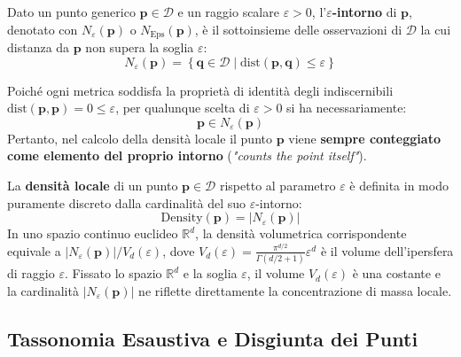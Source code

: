 \begin{definition}
Dato un punto generico $\mathbf{p} \in \mathcal{D}$ e un raggio scalare $\varepsilon > 0$, l'\textbf{$\varepsilon$-intorno} di $\mathbf{p}$, denotato con $N_\varepsilon(\mathbf{p})$ o $N_{\mathrm{Eps}}(\mathbf{p})$, è il sottoinsieme delle osservazioni di $\mathcal{D}$ la cui distanza da $\mathbf{p}$ non supera la soglia $\varepsilon$:
\begin{equation}
    N_\varepsilon(\mathbf{p}) = \left\{ \mathbf{q} \in \mathcal{D} \;\big|\; \mathrm{dist}(\mathbf{p}, \mathbf{q}) \le \varepsilon \right\}
    \label{eq:dm-eps-neighborhood}
\end{equation}
\end{definition}

\begin{remark}
Poiché ogni metrica soddisfa la proprietà di identità degli indiscernibili $\mathrm{dist}(\mathbf{p}, \mathbf{p}) = 0 \le \varepsilon$, per qualunque scelta di $\varepsilon > 0$ si ha necessariamente:
\begin{equation}
    \mathbf{p} \in N_\varepsilon(\mathbf{p})
\end{equation}
Pertanto, nel calcolo della densità locale il punto $\mathbf{p}$ viene \textbf{sempre conteggiato come elemento del proprio intorno} (\textit{"counts the point itself"}).
\end{remark}

\begin{definition}
La \textbf{densità locale} di un punto $\mathbf{p} \in \mathcal{D}$ rispetto al parametro $\varepsilon$ è definita in modo puramente discreto dalla cardinalità del suo $\varepsilon$-intorno:
\begin{equation}
    \mathrm{Density}(\mathbf{p}) = |N_\varepsilon(\mathbf{p})|
    \label{eq:dm-local-density}
\end{equation}
In uno spazio continuo euclideo $\mathbb{R}^d$, la densità volumetrica corrispondente equivale a $|N_\varepsilon(\mathbf{p})| / V_d(\varepsilon)$, dove $V_d(\varepsilon) = \frac{\pi^{d/2}}{\Gamma(d/2 + 1)} \varepsilon^d$ è il volume dell'ipersfera di raggio $\varepsilon$. Fissato lo spazio $\mathbb{R}^d$ e la soglia $\varepsilon$, il volume $V_d(\varepsilon)$ è una costante e la cardinalità $|N_\varepsilon(\mathbf{p})|$ ne riflette direttamente la concentrazione di massa locale.
\end{definition}

\subsection{Tassonomia Esaustiva e Disgiunta dei Punti}

